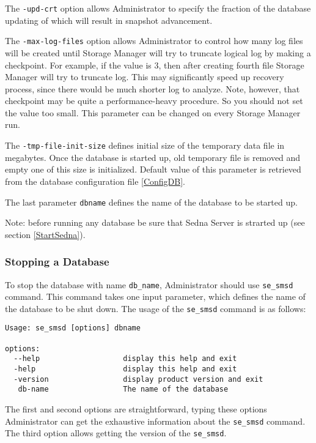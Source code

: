\documentclass[a4paper,12pt]{article}
\begin{document}
The \verb!-upd-crt! option allows Administrator to specify the fraction of the database updating of which will result in snapshot advancement.

The \verb!-max-log-files! option allows Administrator to control how many log files will be created until Storage Manager will try
to truncate logical log by making a checkpoint. For example, if the value is $3$, then after creating fourth file Storage Manager will try to truncate log. This may significantly speed up recovery process, since there would be much shorter log to analyze. Note, however, that checkpoint may be quite a performance-heavy procedure. So you should not set the value too small. This parameter can be changed on every Storage Manager run.

The \verb!-tmp-file-init-size! defines initial size of the temporary data file in megabytes. Once the database is started up, old temporary file is removed and empty one of this size is initialized. Default value
of this parameter is retrieved from the database configuration file \ref{ConfigDB}.

The last parameter \verb!dbname! defines the name of the database to be started up.


Note: before running any database be sure that Sedna Server is strarted up (see section \ref{StartSedna}).

\subsubsection{Stopping a Database}
\label{StopDB}

To stop the database with name \verb!db_name!, Administrator should use \verb!se_smsd! command. This command takes one input parameter, which defines the name of the database to be shut down. The usage of the \verb!se_smsd! command is as follows:

\begin{verbatim}
Usage: se_smsd [options] dbname

options:
  --help                   display this help and exit
  -help                    display this help and exit
  -version                 display product version and exit
   db-name                 The name of the database
\end{verbatim}

The first and second options are straightforward, typing these options Administrator can get the exhaustive information about the \verb!se_smsd! command.
The third option allows getting the version of the \verb!se_smsd!.
\end{document}
